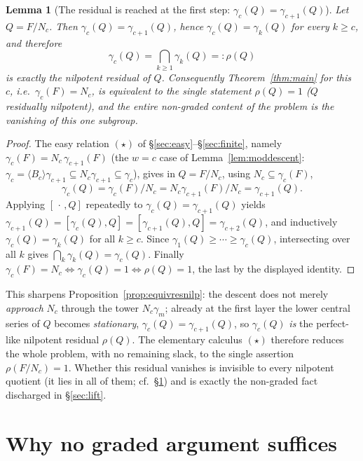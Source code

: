 \documentclass{amsart}
\newtheorem{lemma}{Lemma}
\theoremstyle{definition}
\theoremstyle{remark}
\begin{document}
\begin{lemma}[The residual is reached at the first step: $\gamma_c(Q)=\gamma_{c+1}(Q)$]
\label{lem:stable}
Let $Q=F/N_c$. Then $\gamma_c(Q)=\gamma_{c+1}(Q)$, hence $\gamma_c(Q)=\gamma_k(Q)$ for
every $k\ge c$, and therefore
\[
\gamma_c(Q)=\bigcap_{k\ge1}\gamma_k(Q)=:\rho(Q)
\]
is exactly the nilpotent residual of $Q$. Consequently
Theorem~\ref{thm:main} for this $c$, i.e.\ $\gamma_c(F)=N_c$, is \emph{equivalent} to the
single statement $\rho(Q)=1$ \textup{(}$Q$ residually nilpotent\textup{)}, and the entire
non-graded content of the problem is the vanishing of this one subgroup.
\end{lemma}
\begin{proof}
The easy relation $(\star)$ of \S\ref{sec:easy}--\S\ref{sec:finite}, namely
$\gamma_c(F)=N_c\,\gamma_{c+1}(F)$ \textup{(}the $w=c$ case of
Lemma~\ref{lem:moddescent}: $\gamma_c=\langle B_c\rangle\gamma_{c+1}\subseteq
N_c\gamma_{c+1}\subseteq\gamma_c$\textup{)}, gives in $Q=F/N_c$, using
$N_c\subseteq\gamma_c(F)$,
\[
\gamma_c(Q)=\gamma_c(F)/N_c=N_c\gamma_{c+1}(F)/N_c=\gamma_{c+1}(Q).
\]
Applying $[\,\cdot\,,Q]$ repeatedly to $\gamma_c(Q)=\gamma_{c+1}(Q)$ yields
$\gamma_{c+1}(Q)=[\gamma_c(Q),Q]=[\gamma_{c+1}(Q),Q]=\gamma_{c+2}(Q)$, and inductively
$\gamma_c(Q)=\gamma_k(Q)$ for all $k\ge c$. Since $\gamma_1(Q)\ge\cdots\ge\gamma_c(Q)$,
intersecting over all $k$ gives $\bigcap_k\gamma_k(Q)=\gamma_c(Q)$. Finally
$\gamma_c(F)=N_c\iff\gamma_c(Q)=1\iff\rho(Q)=1$, the last by the displayed identity.
\end{proof}

\noindent This sharpens Proposition~\ref{prop:equivresnilp}: the descent does not merely
\emph{approach} $N_c$ through the tower $N_c\gamma_m$; already at the first layer the
lower central series of $Q$ becomes \emph{stationary}, $\gamma_c(Q)=\gamma_{c+1}(Q)$, so
$\gamma_c(Q)$ \emph{is} the perfect-like nilpotent residual $\rho(Q)$. The elementary
calculus $(\star)$ therefore reduces the whole problem, with no remaining slack, to the
single assertion $\rho(F/N_c)=1$. Whether this residual vanishes is invisible to every
nilpotent quotient (it lies in all of them; cf.\ \S\ref{sec:why}) and is exactly the
non-graded fact discharged in \S\ref{sec:lift}.

\section{Why no graded argument suffices}\label{sec:why}
\end{document}
